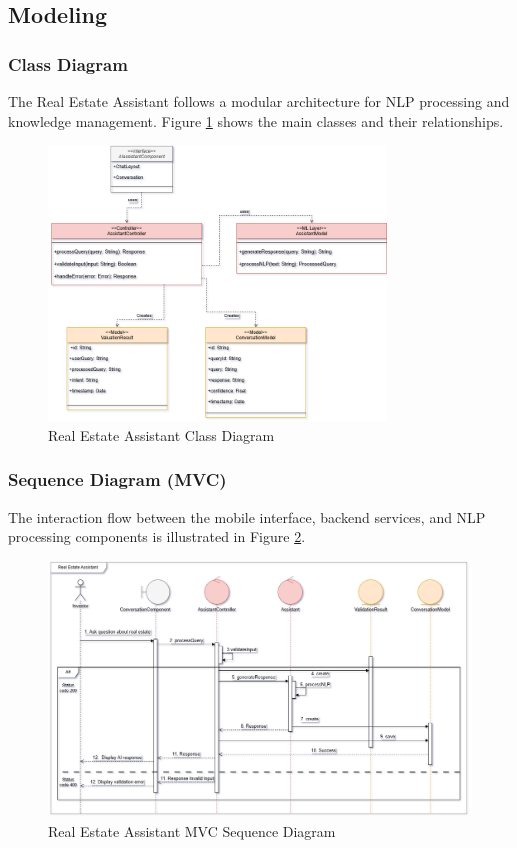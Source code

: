 \subsection{Modeling}
\subsubsection{Class Diagram}
The Real Estate Assistant follows a modular architecture for NLP processing and knowledge management. Figure \ref{fig:assistant-class-diagram} shows the main classes and their relationships.

\begin{figure}[htbp]
    \centering
    \includegraphics[width=0.8\textwidth]{images/assistant_class_diagram.png}
    \caption{Real Estate Assistant Class Diagram}
    \label{fig:assistant-class-diagram}
\end{figure}

\subsubsection{Sequence Diagram (MVC)}
The interaction flow between the mobile interface, backend services, and NLP processing components is illustrated in Figure \ref{fig:assistant-sequence-mvc}.
\newpage
\begin{figure}[htbp]
    \centering
    \includegraphics[width=1\textwidth]{images/assistant_sequence_mvc.png}
    \caption{Real Estate Assistant MVC Sequence Diagram}
    \label{fig:assistant-sequence-mvc}
\end{figure}

